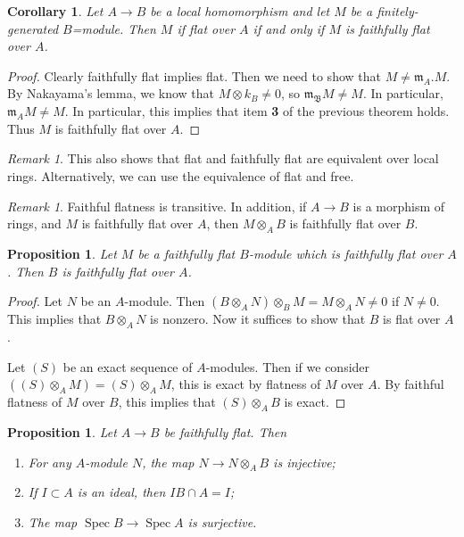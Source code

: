 \documentclass[leqno, openany]{memoir}
\newtheorem{cor}[thm]{Corollary}
\newtheorem{prop}[thm]{Proposition}
\theoremstyle{definition}
\theoremstyle{remark}
\newtheorem{rmk}[thm]{Remark}
\theoremstyle{plain}
\theoremstyle{definition}
\theoremstyle{remark}
\newcommand{\mf}[1]{\mathfrak{#1}}
\DeclareMathOperator{\Spec}{Spec}
\begin{document}
\begin{cor} Let $A \to B$ be a local homomorphism and let $M$ be a
finitely-generated $B$=module. Then $M$ if flat over $A$ if and only if $M$ is
faithfully flat over $A$.  \end{cor}

\begin{proof} Clearly faithfully flat implies flat. Then we need to show that
    $M \neq \mf{m}_A. M$. By Nakayama's lemma, we know that $M \otimes k_B \neq
    0$, so $\mf{m_B} M \neq M$. In particular, $\mf{m}_A M \neq M$. In
    particular, this implies that item \textbf{3} of the previous theorem
    holds. Thus $M$ is faithfully flat over $A$.  \end{proof}

\begin{rmk} This also shows that flat and faithfully flat are equivalent over
local rings. Alternatively, we can use the equivalence of flat and free.
\end{rmk}

\begin{rmk} Faithful flatness is transitive. In addition, if $A \to B$ is a
morphism of rings, and $M$ is faithfully flat over $A$, then $M \otimes_A B$ is
faithfully flat over $B$.  \end{rmk}

\begin{prop} Let $M$ be a faithfully flat $B$-module which is faithfully flat
over $A$. Then $B$ is faithfully flat over $A$.  \end{prop}

\begin{proof} Let $N$ be an $A$-module. Then $(B \otimes_A N) \otimes_B M = M
    \otimes_A N \neq 0$ if $N \neq 0$. This implies that $B \otimes_A N$ is
    nonzero. Now it suffices to show that $B$ is flat over $A$.

    Let $(S)$ be an exact sequence of $A$-modules. Then if we consider $((S)
\otimes_A M) = (S) \otimes_A M$, this is exact by flatness of $M$ over $A$. By
faithful flatness of $M$ over $B$, this implies that $(S) \otimes_A B$ is
exact.  \end{proof}

\begin{prop} Let $A \to B$ be faithfully flat. Then \begin{enumerate} \item For
    any $A$-module $N$, the map $N \to N \otimes_A B$ is injective; \item If $I
    \subset A$ is an ideal, then $IB \cap A = I$; \item The map $\Spec B \to
    \Spec A$ is surjective.  \end{enumerate} \end{prop}
\end{document}
